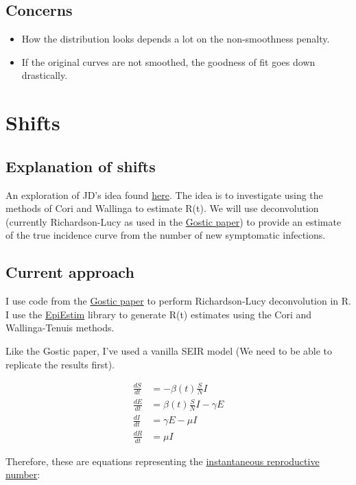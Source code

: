\documentclass{article}
\begin{document}
\subsection{Concerns}
\begin{itemize}
    \item How the distribution looks depends a lot on the non-smoothness penalty.
    \item If the original curves are not smoothed, the goodness of fit goes down drastically.
\end{itemize}

\pagebreak
\section{Shifts}
\subsection{Explanation of shifts}
An exploration of JD's idea found  \href{http://dushoff.github.io/notebook/shifts.html}{here}. The idea is to investigate using the methods of Cori and Wallinga to estimate R(t). We will use deconvolution (currently Richardson-Lucy as used in the \href{https://www.medrxiv.org/content/10.1101/2020.06.18.20134858v3}{Gostic paper}) to provide an estimate of the true incidence curve from the number of new symptomatic infections. 

\subsection{Current approach}
I use code from the \href{https://github.com/cobeylab/Rt_estimation}{Gostic paper} to perform Richardson-Lucy deconvolution in R. I use the \href{https://cran.r-project.org/web/packages/EpiEstim/index.html}{EpiEstim} library to generate R(t) estimates using the Cori and Wallinga-Tenuis methods. 

Like the Gostic paper, I've used a vanilla SEIR model (We need to be able to replicate the results first).

\begin{align}
\frac{dS}{dt} &= -\beta(t) \frac{S}{N}  I \\ 
\frac{dE}{dt} &= \beta(t) \frac{S}{N} I - \gamma E \\
\frac{dI}{dt} &= \gamma E - \mu I \\ 
\frac{dR}{dt} &= \mu I  
\end{align}

Therefore, these are equations representing the \href{https://www.ncbi.nlm.nih.gov/pmc/articles/PMC3935673/}{instantaneous reproductive number}:
\end{document}
